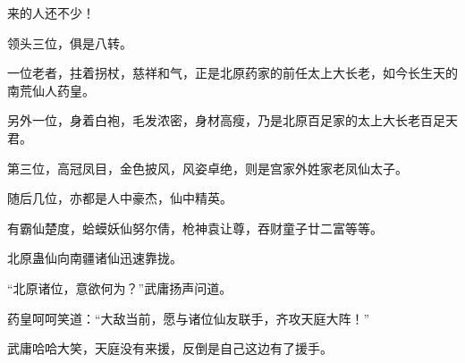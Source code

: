 \begin{this_body}
来的人还不少！

领头三位，俱是八转。

一位老者，拄着拐杖，慈祥和气，正是北原药家的前任太上大长老，如今长生天的南荒仙人药皇。

另外一位，身着白袍，毛发浓密，身材高瘦，乃是北原百足家的太上大长老百足天君。

第三位，高冠凤目，金色披风，风姿卓绝，则是宫家外姓家老凤仙太子。

随后几位，亦都是人中豪杰，仙中精英。

有霸仙楚度，蛤蟆妖仙努尔倩，枪神袁让尊，吞财童子廿二富等等。

北原蛊仙向南疆诸仙迅速靠拢。

“北原诸位，意欲何为？”武庸扬声问道。

药皇呵呵笑道：“大敌当前，愿与诸位仙友联手，齐攻天庭大阵！”

武庸哈哈大笑，天庭没有来援，反倒是自己这边有了援手。

\end{this_body}

